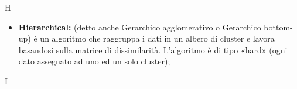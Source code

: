 \Huge H
\normalsize
\begin{itemize}
\item\textbf{Hierarchical:} (detto anche Gerarchico agglomerativo\glossario{} o Gerarchico bottom-up\glossario{}) è un algoritmo che raggruppa i dati in un albero di cluster\glossario{} e lavora basandosi sulla matrice di dissimilarità. L'algoritmo è di tipo «hard» (ogni dato assegnato ad uno ed un solo cluster);
\end{itemize}
\pagebreak

\Huge I
\normalsize
